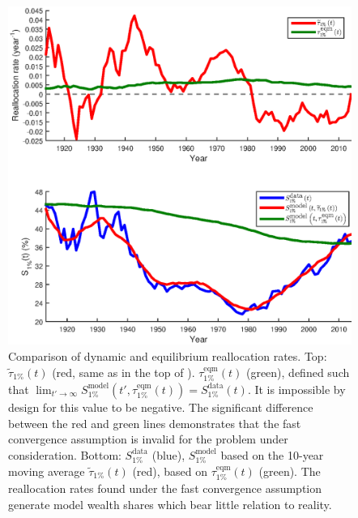 \begin{figure}[!htb]
\centering
\includegraphics[width=1.0\textwidth] {./chapter_3/figs/tau_eqm_top1.eps}
\caption{Comparison of dynamic and equilibrium reallocation rates. Top: $\widetilde{\tau}_{1\%}\left(t\right)$ (red, same as in the top of ). $\tau^\text{eqm}_{1\%}\left(t\right)$ (green), defined such that $\lim_{t'\to\infty} S^{\text{model}}_{1\%}\left(t',\tau^\text{eqm}_{1\%}\left(t\right)\right)=S^{\text{data}}_{1\%}\left(t\right)$. It is impossible by design for this value to be negative. The significant difference between the red and green lines demonstrates that the fast convergence assumption is invalid for the problem under consideration. Bottom: $S^{\text{data}}_{1\%}$ (blue), $S^{\text{model}}_{1\%}$ based on the 10-year moving average $\widetilde{\tau}_{1\%}\left(t\right)$ (red), based on $\tau^\text{eqm}_{1\%}\left(t\right)$ (green). The reallocation rates found under the fast convergence assumption generate model wealth shares which bear little relation to reality.}
\end{figure}

